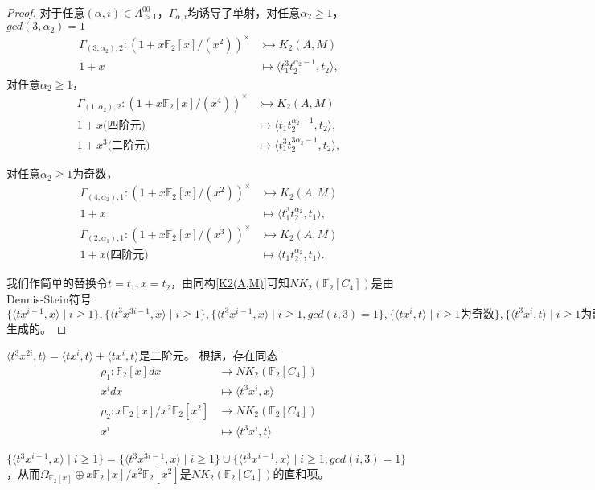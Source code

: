 \begin{proof}
对于任意$(\alpha,i)\in \Lambda^{00}_{>1}$，$\Gamma_{\alpha,i}$均诱导了单射，对任意$\alpha_2\geq 1$，$gcd(3,\alpha_2)=1$
  \begin{align*}
 \Gamma_{(3,\alpha_2),2} \colon (1+x \mathbb{F}_2[x]/(x^{2}))^{\times} &\rightarrowtail K_2(A,M)\\
 1+x &\mapsto  \langle t_1^3t_2^{\alpha_2-1},t_2 \rangle,
 \end{align*}
对任意$\alpha_2\geq 1$，
  \begin{align*}
 \Gamma_{(1,\alpha_2),2} \colon (1+x \mathbb{F}_2[x]/(x^{4}))^{\times} &\rightarrowtail K_2(A,M)\\
 1+x \text{(四阶元)} &\mapsto \langle t_1t_2^{\alpha_2-1},t_2 \rangle,\\
 1+x^3 \text{(二阶元)} &\mapsto \langle t_1^3t_2^{3\alpha_2-1},t_2 \rangle,
 \end{align*}

对任意$\alpha_2\geq 1$为奇数，
 \begin{align*}
 \Gamma_{(4,\alpha_2),1} \colon (1+x \mathbb{F}_2[x]/(x^{2}))^{\times} &\rightarrowtail K_2(A,M)\\
 1+x &\mapsto \langle t_1^3t_2^{\alpha_2},t_1 \rangle,
 \end{align*}
 \begin{align*}
 \Gamma_{(2,\alpha_1),1} \colon (1+x \mathbb{F}_2[x]/(x^{3}))^{\times} &\rightarrowtail K_2(A,M)\\
 1+x\text{(四阶元)} &\mapsto \langle t_1t_2^{\alpha_2},t_1 \rangle.
 \end{align*}

我们作简单的替换令$t=t_1, x=t_2$，由同构\ref{K2(A,M)}可知$NK_2(\mathbb{F}_2[C_4])$是由Dennis-Stein符号$\{\langle tx^{i-1},x \rangle \mid i\geq 1\},\{\langle t^3x^{3i-1},x \rangle \mid i\geq 1\},\{\langle t^3x^{i-1},x \rangle \mid i\geq 1,gcd(i,3)=1\},\{\langle tx^i,t \rangle \mid i\geq 1\text{为奇数}\},\{\langle t^3x^i,t \rangle \mid i\geq 1\text{为奇数}\}$生成的。

\end{proof}

\begin{remark}

	$\langle t^3x^{2i},t \rangle =\langle tx^{i},t \rangle+\langle tx^{i},t \rangle$是二阶元。
	根据\cite{MR80k:13005}，存在同态
	\begin{align*}
	\rho_1 \colon \mathbb{F}_2[x]dx &\longrightarrow NK_2(\mathbb{F}_2[C_4])\\
				x^idx &\mapsto \langle t^3x^i,x\rangle \\
	\rho_2 \colon x\mathbb{F}_2[x]/x^2\mathbb{F}_2[x^2] &\longrightarrow NK_2(\mathbb{F}_2[C_4])\\
				x^i &\mapsto \langle t^3x^i,t\rangle 
	\end{align*}

	$\{\langle t^3x^{i-1},x \rangle \mid i\geq 1\}=\{\langle t^3x^{3i-1},x \rangle \mid i\geq 1\}\cup\{\langle t^3x^{i-1},x \rangle \mid i\geq 1,gcd(i,3)=1\}$，从而$\Omega_{\mathbb{F}_2[x]}\oplus x\mathbb{F}_2[x]/x^2\mathbb{F}_2[x^2]$是$NK_2(\mathbb{F}_2[C_4])$的直和项。
\end{remark}

